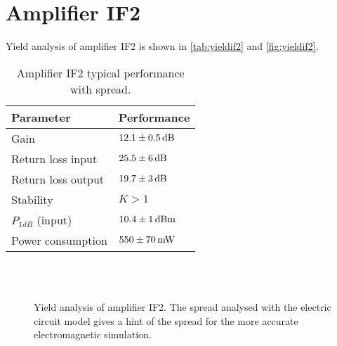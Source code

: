 	\section{Amplifier IF2}\label{sec:yieldif2}
		Yield analysis of amplifier IF2 is shown in \autoref{tab:yieldif2} and \autoref{fig:yieldif2}.

		\begin{table}[hbt!]
			\caption[Amplifier IF2 performance with spread.]{Amplifier IF2 typical performance with spread.}
			\label{tab:yieldif2}
			\centering
			\begin{tabular}{ l l } \toprule
				Parameter & Performance \\\midrule
				Gain & $\unit[12.1\pm 0.5]{dB}$ \\
				Return loss input & $\unit[25.5\pm 6]{dB}$ \\
				Return loss output & $\unit[19.7\pm 3]{dB}$ \\
				Stability & $K>1$ \\
				$P_{1dB}$ (input) & $\unit[10.4\pm 1]{dBm}$ \\
				Power consumption &  $\unit[550\pm 70]{mW}$ \\\bottomrule
			\end{tabular}
		\end{table}

		\begin{figure}[hp!]
			\centering
			 \\
			 \\
			\caption[Yield analysis of amplifier IF2.]{Yield analysis of amplifier IF2. The spread analysed with the electric circuit model gives a hint of the spread for the more accurate electromagnetic simulation.}\label{fig:yieldif2}
		\end{figure}

